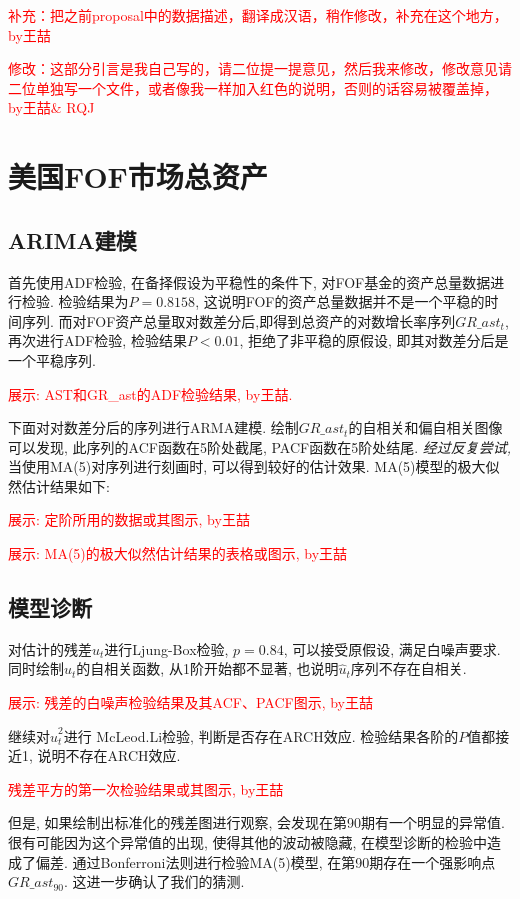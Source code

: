 \documentclass[10.5pt,onecolumn,a4paper]{article}%
\begin{document}
\textcolor{red}{补充：把之前proposal中的数据描述，翻译成汉语，稍作修改，补充在这个地方，by王喆}

\textcolor{red}{修改：这部分引言是我自己写的，请二位提一提意见，然后我来修改，修改意见请二位单独写一个文件，或者像我一样加入红色的说明，否则的话容易被覆盖掉，by王喆\& RQJ}

\section{美国FOF市场总资产}
\subsection{ARIMA建模}
首先使用ADF检验, 在备择假设为平稳性的条件下, 对FOF基金的资产总量数据进行检验. 检验结果为$P=0.8158$, 这说明FOF的资产总量数据并不是一个平稳的时间序列. 而对FOF资产总量取对数差分后,即得到总资产的对数增长率序列${GR\_ast_t}$, 再次进行ADF检验, 检验结果$P<0.01$, 拒绝了非平稳的原假设, 即其对数差分后是一个平稳序列.

\textcolor{red}{展示: AST和GR\_ast的ADF检验结果, by王喆. }

下面对对数差分后的序列进行ARMA建模. 绘制$GR\_ast_t$的自相关和偏自相关图像可以发现, 此序列的ACF函数在5阶处截尾, PACF函数在5阶处结尾. \emph{经过反复尝试,} 当使用MA(5)对序列进行刻画时, 可以得到较好的估计效果. MA(5)模型的极大似然估计结果如下:

\textcolor{red}{展示: 定阶所用的数据或其图示, by王喆}

\textcolor{red}{展示: MA(5)的极大似然估计结果的表格或图示, by王喆}

\subsection{模型诊断}

对估计的残差$\hat{u}_t$进行Ljung-Box检验, $p=0.84$, 可以接受原假设, 满足白噪声要求. 同时绘制$\hat{u}_t$的自相关函数, 从1阶开始都不显著, 也说明$\hat{u}_t$序列不存在自相关.

\textcolor{red}{展示: 残差的白噪声检验结果及其ACF、PACF图示, by王喆}

继续对$\hat{u}_t^2$进行 McLeod.Li检验, 判断是否存在ARCH效应. 检验结果各阶的$P$值都接近1, 说明不存在ARCH效应.

\textcolor{red}{残差平方的第一次检验结果或其图示, by王喆}

但是, 如果绘制出标准化的残差图进行观察, 会发现在第90期有一个明显的异常值. 很有可能因为这个异常值的出现, 使得其他的波动被隐藏, 在模型诊断的检验中造成了偏差. 通过Bonferroni法则进行检验MA(5)模型, 在第90期存在一个强影响点$GR\_ast_{90}$. 这进一步确认了我们的猜测.
\end{document}
